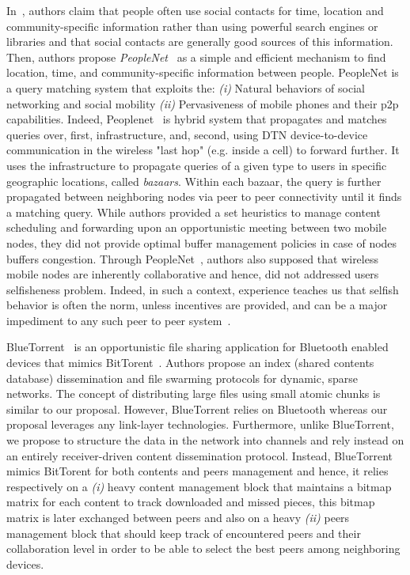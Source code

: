 In~\cite{Peoplenet}, authors claim that people often use social contacts for time, location and community-specific information rather than using powerful search engines or libraries and that social contacts are generally good sources of this information. Then, authors propose  \emph{PeopleNet}~\cite{Peoplenet} as a simple and efficient mechanism to find location, time, and community-specific information between people. PeopleNet is a query matching system that exploits the: \emph{(i)} Natural behaviors of social networking and social mobility \emph{(ii)} Pervasiveness of mobile phones and their p2p capabilities. Indeed, Peoplenet~\cite{Peoplenet} is hybrid system that propagates and matches queries over, first, infrastructure, and, second, using DTN device-to-device communication in the wireless "last hop" (e.g. inside a cell) to forward further. It uses the  infrastructure to propagate queries of a given type to users in specific geographic locations, called \emph{bazaars}. Within each bazaar, the query is further propagated between neighboring nodes via peer to peer connectivity until it finds a matching query. While authors provided a set heuristics to manage content scheduling and forwarding upon an opportunistic meeting between two mobile nodes, they did not provide optimal buffer management policies in case of nodes buffers congestion. Through PeopleNet~\cite{PeopleNet}, authors also supposed that wireless mobile nodes are inherently collaborative and hence, did not addressed users selfisheness problem. Indeed, in such a context, experience teaches us that selfish behavior is often the norm, unless incentives are provided, and can be a major impediment to any such peer to peer system~\cite{NashEquilibria}.
  
BlueTorrent~\cite{BlueTorrent} is an opportunistic file sharing application for Bluetooth enabled devices that mimics BitTorent~\cite{RefBT}. Authors propose an index (shared contents database) dissemination and file swarming protocols for dynamic, sparse networks. The concept of distributing large files using small atomic chunks is similar to our proposal. However, BlueTorrent relies on Bluetooth whereas our proposal leverages any link-layer technologies. Furthermore, unlike BlueTorrent, we propose to structure the data in the network into channels and rely instead on an entirely receiver-driven content dissemination protocol. Instead, BlueTorrent mimics BitTorent for both contents and peers management and hence, it relies respectively on a \emph{(i)} heavy content management block that maintains a bitmap matrix for each content to track downloaded and missed pieces, this bitmap matrix is later exchanged between peers and also on a heavy \emph{(ii)} peers management block that should keep track of encountered peers and their collaboration level in order to be able to select the best peers among neighboring devices.

